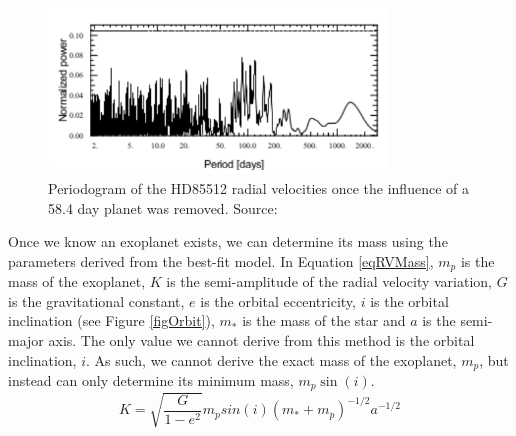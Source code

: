 \begin{figure}
    \centering
    \includegraphics[width=0.8\textwidth]{HD85512_residuals.pdf}
    \caption{Periodogram of the HD85512 radial velocities once the influence of a 58.4 day planet was removed. Source: \citet{2011Pepe}}
    \label{figHD85512Residual}
\end{figure}

Once we know an exoplanet exists, we can determine its mass using the parameters derived from the best-fit model. In Equation \ref{eqRVMass}, $m_p$ is the mass of the exoplanet, $K$ is the semi-amplitude of the radial velocity variation, $G$ is the gravitational constant, $e$ is the orbital eccentricity, $i$ is the orbital inclination (see Figure \ref{figOrbit}), $m_\ast$ is the mass of the star and $a$ is the semi-major axis. The only value we cannot derive from this method is the orbital inclination, $i$. As such, we cannot derive the exact mass of the exoplanet, $m_{p}$, but instead can only determine its minimum mass, $m_{p}\sin(i)$.\\

\begin{equation}
K = \sqrt{\frac{G}{1-e^2}} m_p sin(i) (m_\ast + m_p)^{-1/2} a^{-1/2}
\label{eqRVMass}
\end{equation}

